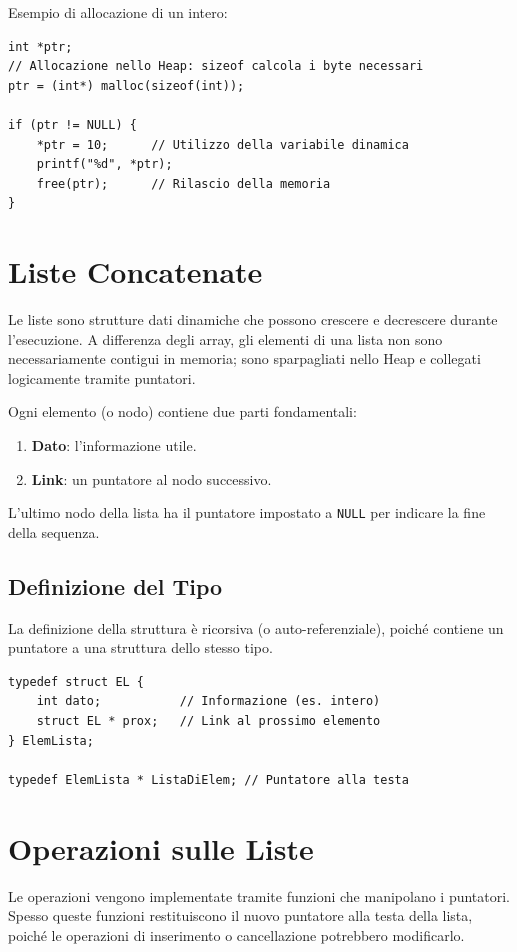 \documentclass[oneside]{scrbook}
\begin{document}
Esempio di allocazione di un intero:
\begin{lstlisting}[style=cstyle]
int *ptr;
// Allocazione nello Heap: sizeof calcola i byte necessari
ptr = (int*) malloc(sizeof(int)); 

if (ptr != NULL) {
    *ptr = 10;      // Utilizzo della variabile dinamica
    printf("%d", *ptr);
    free(ptr);      // Rilascio della memoria
}
\end{lstlisting}

\section{Liste Concatenate}

Le liste sono strutture dati dinamiche che possono crescere e decrescere durante l'esecuzione. A differenza degli array, gli elementi di una lista non sono necessariamente contigui in memoria; sono sparpagliati nello Heap e collegati logicamente tramite puntatori.


Ogni elemento (o nodo) contiene due parti fondamentali:
\begin{enumerate}
    \item \textbf{Dato}: l'informazione utile.
    \item \textbf{Link}: un puntatore al nodo successivo.
\end{enumerate}
L'ultimo nodo della lista ha il puntatore impostato a \texttt{NULL} per indicare la fine della sequenza.

\subsection{Definizione del Tipo}
La definizione della struttura è ricorsiva (o auto-referenziale), poiché contiene un puntatore a una struttura dello stesso tipo.

\begin{lstlisting}[style=cstyle]
typedef struct EL {
    int dato;           // Informazione (es. intero)
    struct EL * prox;   // Link al prossimo elemento
} ElemLista;

typedef ElemLista * ListaDiElem; // Puntatore alla testa
\end{lstlisting}

\section{Operazioni sulle Liste}

Le operazioni vengono implementate tramite funzioni che manipolano i puntatori. Spesso queste funzioni restituiscono il nuovo puntatore alla testa della lista, poiché le operazioni di inserimento o cancellazione potrebbero modificarlo.
\end{document}
